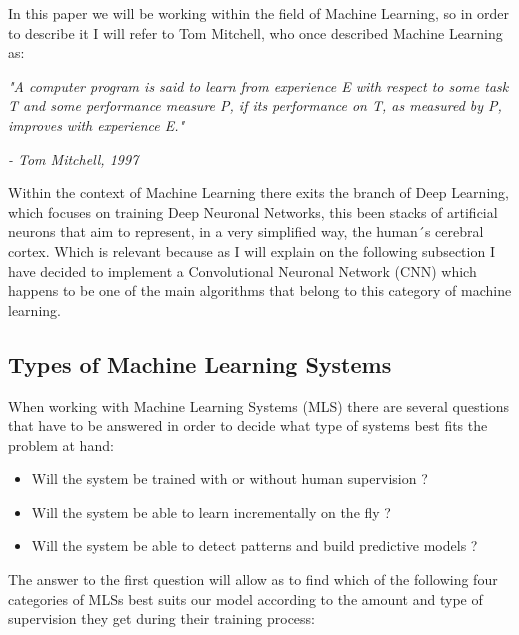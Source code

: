 \documentclass[12pt, a4paper]{article}
\begin{document}
	In this paper we will be working within the field of Machine Learning, so in order to describe it I will refer to Tom Mitchell, who once described Machine Learning as: 
	
	\textit{"A computer program is said to learn from experience E with respect to some task T and some performance measure P, if its performance on T, as measured by P, improves with experience E."}
	\begin{flushright}
		\textit{- Tom Mitchell, 1997 \cite{handsonmachinelearning}}
	\end{flushright}
	
	Within the context of Machine Learning there exits the branch of Deep Learning, which focuses on training Deep Neuronal Networks, this been stacks of artificial neurons that aim to represent, in a very simplified way, the human´s cerebral cortex. Which is relevant because as I will explain on the following subsection I have decided to implement a Convolutional Neuronal Network (CNN) which happens to be one of the main algorithms that belong to this category of machine learning.
	
	
	\clearpage
	
	\subsection{Types of Machine Learning Systems }
	
	When working with Machine Learning Systems (MLS) there are several questions that have to be answered in order to decide what type of systems best fits the problem at hand: \cite{handsonmachinelearning}
	
	\begin{itemize}
		
		\item Will the system be trained with or without human supervision ?
		
		\item Will the system be able to learn incrementally on the fly ?
		
		\item Will the system be able to detect patterns and build predictive models ?
		
	\end{itemize}
	
	The answer to the first question will allow as to find which of the following four categories of MLSs best suits our model according to the amount and type of supervision they get during their training process: 
	
\end{document}
